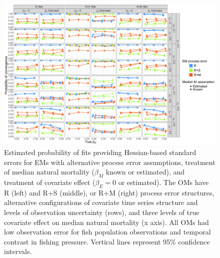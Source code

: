 \documentclass[
  12pt,
]{article}
\begin{document}
\pagebreak

\begin{landscape}
\begin{figure}
\begin{center}
\includegraphics{convergence_main}
\end{center}
\caption{Estimated probability of fits providing Hessian-based standard errors for EMs with alternative process error assumptions, treatment of median natural mortality ($\beta_M$ known or estimated), and treatment of covariate effect ($\beta_E = 0$ or estimated). The OMs have R (left) and R+S (middle), or R+M (right) process error structures, alternative configurations of covariate time series structure and levels of observation uncertainty (rows), and three levels of true covariate effect on median natural mortality (x axis). All OMs had low observation error for fish population observations and temporal contrast in fishing pressure. Vertical lines represent 95\% confidence intervals.}\label{convergence}
\end{figure}
\end{landscape}
\end{document}
